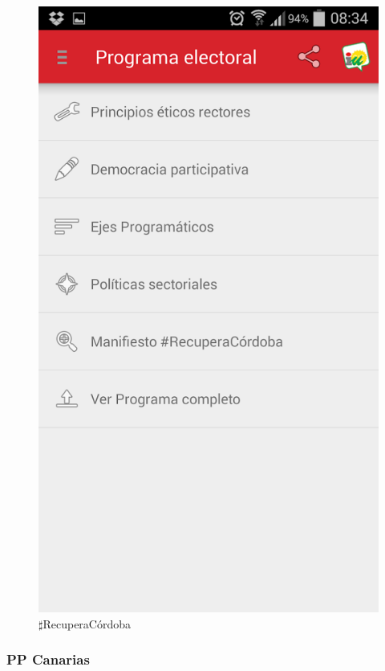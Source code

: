 \begin{figure}[H]
\centering
\includegraphics[keepaspectratio, scale=0.35]{Media/Captures/IURecuperaCordoba.png}
\caption{$\sharp$RecuperaCórdoba}
\label{fig:recuperacordoba}
\end{figure}

\subsubsection{PP Canarias}

